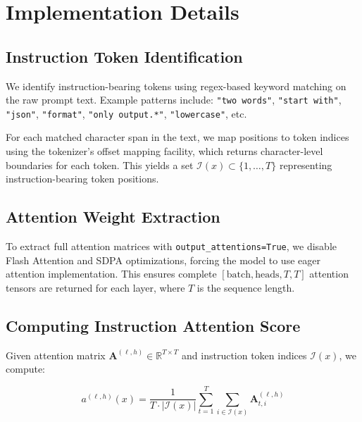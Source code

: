 \section{Implementation Details}
\label{app:implementation}

\subsection{Instruction Token Identification}
\label{app:instruction-tokens}

We identify instruction-bearing tokens using regex-based keyword matching on 
the raw prompt text. Example patterns include: \texttt{"two words"}, 
\texttt{"start with"}, \texttt{"json"}, \texttt{"format"}, 
\texttt{"only output.*"}, \texttt{"lowercase"}, etc.

For each matched character span in the text, we map positions to token indices 
using the tokenizer's offset mapping facility, which returns character-level 
boundaries for each token. This yields a set $\mathcal{I}(x) \subset \{1,\ldots,T\}$ 
representing instruction-bearing token positions.

\subsection{Attention Weight Extraction}
\label{app:attention-extraction}

To extract full attention matrices with \texttt{output\_attentions=True}, we 
disable Flash Attention and SDPA optimizations, forcing the model to use eager 
attention implementation. This ensures complete 
$[\text{batch}, \text{heads}, T, T]$ attention tensors are returned for each 
layer, where $T$ is the sequence length.

\subsection{Computing Instruction Attention Score}
\label{app:compute-attention}

Given attention matrix $\mathbf{A}^{(\ell,h)} \in \mathbb{R}^{T \times T}$ 
and instruction token indices $\mathcal{I}(x)$, we compute:

\begin{equation}
a^{(\ell,h)}(x) = \frac{1}{T \cdot |\mathcal{I}(x)|} 
\sum_{t=1}^{T} \sum_{i \in \mathcal{I}(x)} \mathbf{A}^{(\ell,h)}_{t,i}
\end{equation}

